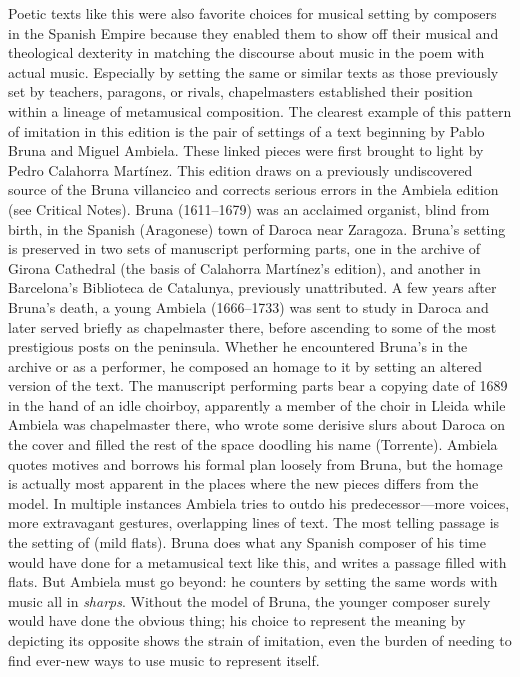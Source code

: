 Poetic texts like this were also favorite choices for musical setting by
composers in the Spanish Empire because they enabled them to show off their
musical and theological dexterity in matching the discourse about music in the
poem with actual music.
Especially by setting the same or similar texts as those previously set
by teachers, paragons, or rivals, chapelmasters established their position
within a lineage of metamusical composition.
The clearest example of this pattern of imitation in this edition is the pair
of settings of a text beginning  by Pablo
Bruna and Miguel Ambiela.
These linked pieces were first brought to light by Pedro Calahorra Martínez.%
    \Autocite{Calahorra:Suban}
This edition draws on a previously undiscovered source of the Bruna villancico
and corrects serious errors in the Ambiela edition (see Critical Notes).
Bruna (1611--1679) was an acclaimed organist, blind from birth, in the
Spanish (Aragonese) town of Daroca near Zaragoza.
Bruna's setting is preserved in two sets of manuscript performing parts, one
in the archive of Girona Cathedral (the basis of Calahorra Martínez's
edition), and another in Barcelona's Biblioteca de Catalunya, previously
unattributed.
A few years after Bruna's death, a young Ambiela (1666--1733) was sent to
study in Daroca and later served briefly as chapelmaster there, before
ascending to some of the most prestigious posts on the peninsula.
Whether he encountered Bruna's  in the archive or as a
performer, he composed an homage to it by setting an altered version of the
text.
The manuscript performing parts bear a copying date of 1689 in the hand of an
idle choirboy, apparently a member of the choir in Lleida while Ambiela was
chapelmaster there, who wrote some derisive slurs about Daroca on the cover
and filled the rest of the space doodling his name (Torrente).
Ambiela quotes motives and borrows his formal plan loosely from Bruna, but the
homage is actually most apparent in the places where the new pieces differs
from the model.
In multiple instances Ambiela tries to outdo his predecessor---more voices,
more extravagant gestures, overlapping lines of text.
The most telling passage is the setting of  (mild
flats).
Bruna does what any Spanish composer of his time would have done for a
metamusical text like this, and writes a passage filled with flats.
But Ambiela must go beyond: he counters by setting the same words with music
all in \emph{sharps}. 
Without the model of Bruna, the younger composer surely would have done the
obvious thing; his choice to represent the meaning by depicting its opposite
shows the strain of imitation, even the burden of needing to find ever-new
ways to use music to represent itself.

